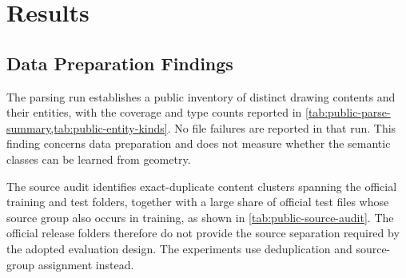 %
%     
%
\chapter{Results}
\label{ch:results}

\section{Data Preparation Findings}
\label{sec:data-preparation-findings}
The parsing run establishes a public inventory of distinct drawing contents and
their entities, with the coverage and type counts reported in
\cref{tab:public-parse-summary,tab:public-entity-kinds}.
No file failures are reported in that run.
This finding concerns data preparation and does not measure whether the semantic
classes can be learned from geometry.

The source audit identifies exact-duplicate content clusters spanning the official
training and test folders, together with a large share of official test files
whose source group also occurs in training, as shown in
\cref{tab:public-source-audit}.
The official release folders therefore do not provide the source separation
required by the adopted evaluation design.
The experiments use deduplication and source-group assignment instead.

\begin{table}[htbp]
  \centering
  \small
  \caption{Source overlap and exact-duplicate evidence in the official release
  folders, before the source-group split used in this work.}
  \label{tab:public-source-audit}
  
\end{table}

